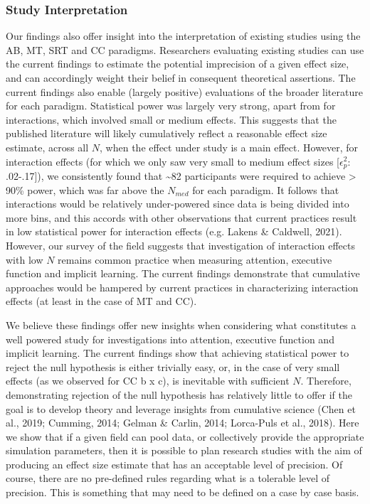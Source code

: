 \documentclass[
  man]{apa6}
\begin{document}
\hypertarget{study-interpretation}{%
\subsubsection{Study Interpretation}\label{study-interpretation}}

Our findings also offer insight into the interpretation of existing studies using the AB, MT, SRT and CC paradigms. Researchers evaluating existing studies can use the current findings to estimate the potential imprecision of a given effect size, and can accordingly weight their belief in consequent theoretical assertions. The current findings also enable (largely positive) evaluations of the broader literature for each paradigm. Statistical power was largely very strong, apart from for interactions, which involved small or medium effects. This suggests that the published literature will likely cumulatively reflect a reasonable effect size estimate, across all \(N\), when the effect under study is a main effect. However, for interaction effects (for which we only saw very small to medium effect sizes {[}\(\epsilon_{p}^2\): .02-.17{]}), we consistently found that \textasciitilde82 participants were required to achieve \textgreater{} 90\% power, which was far above the \(N_{med}\) for each paradigm. It follows that interactions would be relatively under-powered since data is being divided into more bins, and this accords with other observations that current practices result in low statistical power for interaction effects (e.g. Lakens \& Caldwell, 2021). However, our survey of the field suggests that investigation of interaction effects with low \(N\) remains common practice when measuring attention, executive function and implicit learning. The current findings demonstrate that cumulative approaches would be hampered by current practices in characterizing interaction effects (at least in the case of MT and CC).

We believe these findings offer new insights when considering what constitutes a well powered study for investigations into attention, executive function and implicit learning. The current findings show that achieving statistical power to reject the null hypothesis is either trivially easy, or, in the case of very small effects (as we observed for CC b x c), is inevitable with sufficient \(N\). Therefore, demonstrating rejection of the null hypothesis has relatively little to offer if the goal is to develop theory and leverage insights from cumulative science (Chen et al., 2019; Cumming, 2014; Gelman \& Carlin, 2014; Lorca-Puls et al., 2018). Here we show that if a given field can pool data, or collectively provide the appropriate simulation parameters, then it is possible to plan research studies with the aim of producing an effect size estimate that has an acceptable level of precision. Of course, there are no pre-defined rules regarding what is a tolerable level of precision. This is something that may need to be defined on a case by case basis.
\end{document}
